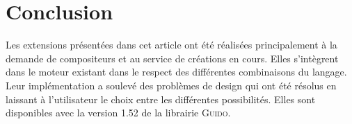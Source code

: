 \documentclass{article}
\newcommand{\guido}			{\textsc{Guido}}
\begin{document}
\section{Conclusion}\label{sec:conclusion}
Les extensions présentées dans cet article ont été réalisées principalement à la demande de compositeurs et au service de créations en cours. Elles s'intègrent dans le moteur existant dans le respect des différentes combinaisons du langage. Leur implémentation a soulevé des problèmes de design qui ont été résolus en laissant à l'utilisateur le choix entre les différentes possibilités. Elles sont disponibles avec la version 1.52 de la librairie \guido.


\balance


\end{document}
